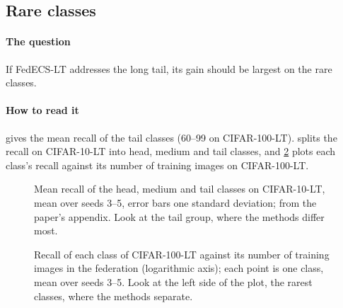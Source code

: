 \subsection{Rare classes}

\paragraph{The question} If FedECS-LT addresses the long tail, its gain should be largest on the rare classes.

\paragraph{How to read it}  gives the mean recall of the tail classes (60--99 on CIFAR-100-LT).
 splits the recall on CIFAR-10-LT into head, medium and tail classes, and \cref{fig:s-recall-size}
plots each class's recall against its number of training images on CIFAR-100-LT.

\begin{table}[t]
\centering\small
\caption{Recall (\%) of the tail classes, the 40\% least frequent; FedECS-LT with its readout, other methods with heads
as trained. From the paper's tail table. Compare FedECS-LT with its heads as trained and with GeFL-F.}
\label{tab:s-tail}
\end{table}

\begin{figure}[t]
\centering
{}
\caption{Mean recall of the head, medium and tail classes on CIFAR-10-LT, mean over seeds 3--5, error bars one standard
deviation; from the paper's appendix. Look at the tail group, where the methods differ most.}
\label{fig:s-hmt}
\end{figure}

\begin{figure}[t]
\centering
{}
\caption{Recall of each class of CIFAR-100-LT against its number of training images in the federation (logarithmic
axis); each point is one class, mean over seeds 3--5. Look at the left side of the plot, the rarest classes, where the
methods separate.}
\label{fig:s-recall-size}
\end{figure}

